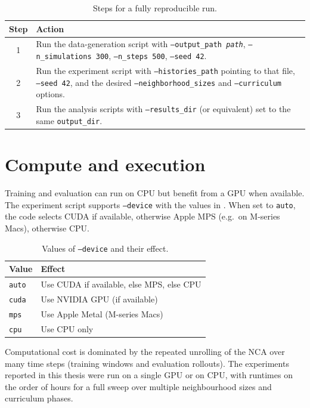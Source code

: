 \begin{table}[htbp]
  \centering
  \caption{Steps for a fully reproducible run.}
  \label{tab:tools:steps}
  \begin{tabular}{@{}cp{10.5cm}@{}}
    \hline
    \textbf{Step} & \textbf{Action} \\
    \hline
    1 & Run the data-generation script with \texttt{--output\_path \textit{path}}, \texttt{--n\_simulations 300}, \texttt{--n\_steps 500}, \texttt{--seed 42}. \\
    2 & Run the experiment script with \texttt{--histories\_path} pointing to that file, \texttt{--seed 42}, and the desired \texttt{--neighborhood\_sizes} and \texttt{--curriculum} options. \\
    3 & Run the analysis scripts with \texttt{--results\_dir} (or equivalent) set to the same \texttt{output\_dir}. \\
    \hline
  \end{tabular}
\end{table}

\section{Compute and execution}

Training and evaluation can run on CPU but benefit from a GPU when available.
The experiment script supports \texttt{--device} with the values in .
When set to \texttt{auto}, the code selects CUDA if available, otherwise Apple MPS (e.g.\ on M-series Macs), otherwise CPU.

\begin{table}[htbp]
  \centering
  \caption{Values of \texttt{--device} and their effect.}
  \label{tab:tools:device}
  \begin{tabular}{@{}ll@{}}
    \hline
    \textbf{Value} & \textbf{Effect} \\
    \hline
    \texttt{auto} & Use CUDA if available, else MPS, else CPU \\
    \texttt{cuda} & Use NVIDIA GPU (if available) \\
    \texttt{mps} & Use Apple Metal (M-series Macs) \\
    \texttt{cpu} & Use CPU only \\
    \hline
  \end{tabular}
\end{table}

Computational cost is dominated by the repeated unrolling of the NCA over many time steps (training windows and evaluation rollouts).
The experiments reported in this thesis were run on a single GPU or on CPU, with runtimes on the order of hours for a full sweep over multiple neighbourhood sizes and curriculum phases.
